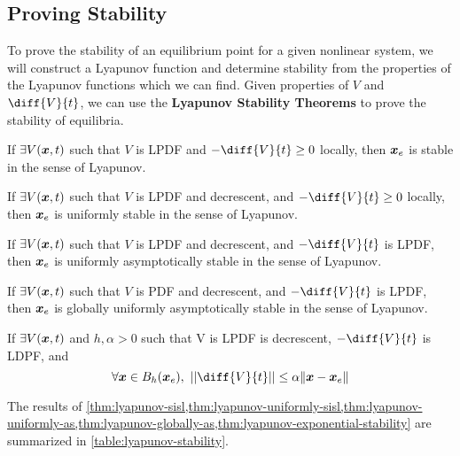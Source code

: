 \subsection{Proving Stability}
To prove the stability of an equilibrium point for a given nonlinear system, we
will construct a Lyapunov function and determine stability from the properties
of the Lyapunov functions which we can find. Given properties of $V$ and $\diff{V}{t}$, we can use the \textbf{Lyapunov
Stability Theorems} to prove the stability of equilibria.
\begin{theorem}
	If $\exists V(\boldsymbol{x}, t)$ such that $V$ is LPDF and
	$-\diff{V}{t} \geq 0$ locally, then $\boldsymbol{x}_e$ is stable in the sense of
	Lyapunov.
	\label{thm:lyapunov-sisl}
\end{theorem}
\begin{theorem}
	If $\exists V(\boldsymbol{x}, t)$ such that $V$ is LPDF and decrescent, and 
	$-\diff{V}{t} \geq 0$ locally, then $\boldsymbol{x}_e$ is uniformly stable in the sense of
	Lyapunov.
	\label{thm:lyapunov-uniformly-sisl}
\end{theorem}
\begin{theorem}
	If $\exists V(\boldsymbol{x}, t)$ such that $V$ is LPDF and decrescent, and 
	$-\diff{V}{t}$ is LPDF, then $\boldsymbol{x}_e$ is uniformly asymptotically stable in the sense of
	Lyapunov.
	\label{thm:lyapunov-uniformly-as}
\end{theorem}
\begin{theorem}
	If $\exists V(\boldsymbol{x}, t)$ such that $V$ is PDF and decrescent, and 
	$-\diff{V}{t}$ is LPDF, then $\boldsymbol{x}_e$ is globally uniformly asymptotically stable in the sense of
	Lyapunov.
	\label{thm:lyapunov-globally-as}
\end{theorem}
\begin{theorem}
	If $\exists V(\boldsymbol{x}, t)$ and $h, \alpha > 0$ such that V is LPDF is
	decrescent, $-\diff{V}{t}$ is LDPF, and \[
		\forall \bs{x}\in B_h(\bs{x}_e),\ \left\lvert\left\lvert\diff{V}{t}\right\rvert\right\rvert \leq \alpha \|\bs{x}-\bs{x}_e\|
	\]
	\label{thm:lyapunov-exponential-stability}
\end{theorem}
The results of
\cref{thm:lyapunov-sisl,thm:lyapunov-uniformly-sisl,thm:lyapunov-uniformly-as,thm:lyapunov-globally-as,thm:lyapunov-exponential-stability}
are summarized in \cref{table:lyapunov-stability}.
